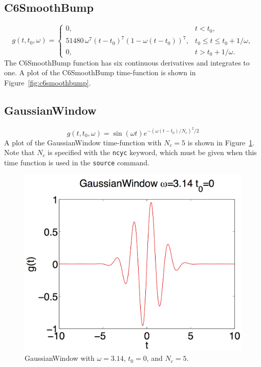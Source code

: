 \documentclass[11pt]{report}
\begin{document}
\subsection{C6SmoothBump} 
\[
g(t,t_0,\omega) = \left\{ 
\begin{array}{ll} 
0, & t < t_0,\\ 
51480\, \omega^7 (t-t_0)^7 (1- \omega(t-t_0))^7, & t_0 \leq t \leq t_0 + 1/\omega,\\ 
0, & t > t_0 + 1/\omega.
\end{array}
\right.
\]
The C6SmoothBump function has six continuous derivatives and integrates to one.
A plot of the C6SmoothBump time-function is shown in Figure~\ref{fig:c6smoothbump}.
%
\subsection{GaussianWindow}
\[
g(t,t_0,\omega) = \sin(\omega t) e^{-(\omega(t-t_0)/N_c)^2/2}
\]
A plot of the GaussianWindow time-function with $N_c=5$ is shown in
Figure~\ref{fig:gaussianwindow}. Note that $N_c$ is specified with the \verb+ncyc+ keyword, which
must be given when this time function is used in the \verb+source+ command.
\begin{figure}
\begin{centering}
  \includegraphics[width=0.6\linewidth]{figures/GW.png}
  \caption{GaussianWindow with $\omega=3.14$, $t_0=0$, and $N_c=5$.}
  \label{fig:gaussianwindow}
\end{centering}
\end{figure}  
\end{document}
